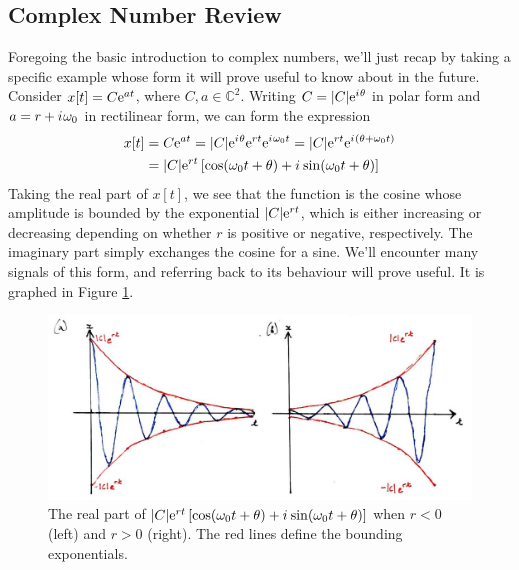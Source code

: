 \subsection{Complex Number Review}
%
Foregoing the basic introduction to complex numbers, we'll just recap by taking a specific
example whose form it will prove useful to know about in the future. Consider $x[t] = C\mathrm{e}^{at}$,
where $C,a\in \mathbb{C}^2$. Writing $C = |C|\mathrm{e}^{{i\mkern1mu}\theta}$ in
polar form and $a = r + {i\mkern1mu}\omega_0$ in rectilinear form, we can form the expression
%
\begin{align*}
  x[t] &= C\mathrm{e}^{at} = |C|\mathrm{e}^{{i\mkern1mu}\theta}\mathrm{e}^{rt}\mathrm{e}^{{i\mkern1mu}\omega_0 t} = |C|\mathrm{e}^{rt}\mathrm{e}^{{i\mkern1mu}(\theta + \omega_0 t)} \\
  &= |C|\mathrm{e}^{rt}\left[ \cos(\omega_0 t + \theta) + {i\mkern1mu}\sin(\omega_0 t + \theta) \right]
\end{align*}
%
Taking the real part of $x[t]$, we see that the function is the cosine whose amplitude is bounded by the
exponential $|C|\mathrm{e}^{rt}$, which is either increasing or decreasing depending on whether $r$ is positive
or negative, respectively. The imaginary part simply exchanges the cosine for a sine.
We'll encounter many signals of this form, and referring back to its behaviour
will prove useful. It is graphed in Figure \ref{fig::lecture_1_complex_numbers}.
%
\begin{figure}[!htb]
  \includegraphics[width=\textwidth]{images/lecture_1_complex_numbers.JPG}
  \caption{
    The real part of
    $|C|\mathrm{e}^{rt}\left[ \cos(\omega_0 t + \theta) + {i\mkern1mu}\sin(\omega_0 t + \theta) \right]$
    when $r < 0$ (left) and $r > 0$ (right). The red lines define the bounding exponentials.
  }
  \label{fig::lecture_1_complex_numbers}
\end{figure}

